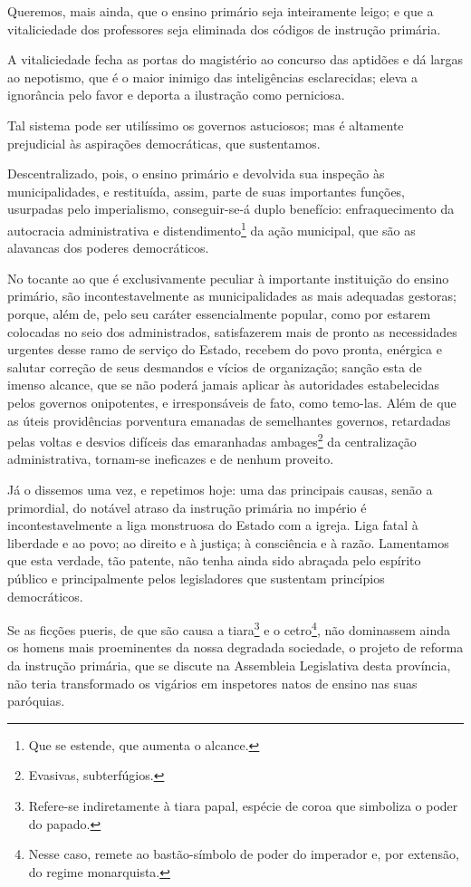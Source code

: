Queremos, mais ainda, que o ensino primário seja inteiramente leigo; e
que a vitaliciedade dos professores seja eliminada dos códigos de
instrução primária.

A vitaliciedade fecha as portas do magistério ao concurso das aptidões e
dá largas ao nepotismo, que é o maior inimigo das inteligências
esclarecidas; eleva a ignorância pelo favor e deporta a ilustração como
perniciosa.

Tal sistema pode ser utilíssimo os governos astuciosos; mas é altamente
prejudicial às aspirações democráticas, que sustentamos.

Descentralizado, pois, o ensino primário e devolvida sua inspeção às
municipalidades, e restituída, assim, parte de suas importantes funções,
usurpadas pelo imperialismo, conseguir-se-á duplo benefício:
enfraquecimento da autocracia administrativa e distendimento\footnote{
  Que se estende, que aumenta o alcance.} da ação municipal, que são as
alavancas dos poderes democráticos.

No tocante ao que é exclusivamente peculiar à importante instituição do
ensino primário, são incontestavelmente as municipalidades as mais
adequadas gestoras; porque, além de, pelo seu caráter essencialmente
popular, como por estarem colocadas no seio dos administrados,
satisfazerem mais de pronto as necessidades urgentes desse ramo de
serviço do Estado, recebem do povo pronta, enérgica e salutar correção
de seus desmandos e vícios de organização; sanção esta de imenso
alcance, que se não poderá jamais aplicar às autoridades estabelecidas
pelos governos onipotentes, e irresponsáveis de fato, como temo-las.
Além de que as úteis providências porventura emanadas de semelhantes
governos, retardadas pelas voltas e desvios difíceis das emaranhadas
ambages\footnote{Evasivas, subterfúgios.} da centralização
administrativa, tornam-se ineficazes e de nenhum proveito.

Já o dissemos uma vez, e repetimos hoje: uma das principais causas,
senão a primordial, do notável atraso da instrução primária no império é
incontestavelmente a liga monstruosa do Estado com a igreja. Liga fatal
à liberdade e ao povo; ao direito e à justiça; à consciência e à razão.
Lamentamos que esta verdade, tão patente, não tenha ainda sido abraçada
pelo espírito público e principalmente pelos legisladores que sustentam
princípios democráticos.

Se as ficções pueris, de que são causa a tiara\footnote{Refere-se
  indiretamente à tiara papal, espécie de coroa que simboliza o poder do
  papado.} e o cetro\footnote{Nesse caso, remete ao bastão-símbolo de
  poder do imperador e, por extensão, do regime monarquista.}, não
dominassem ainda os homens mais proeminentes da nossa degradada
sociedade, o projeto de reforma da instrução primária, que se discute na
Assembleia Legislativa desta província, não teria transformado os
vigários em inspetores natos de ensino nas suas paróquias.

